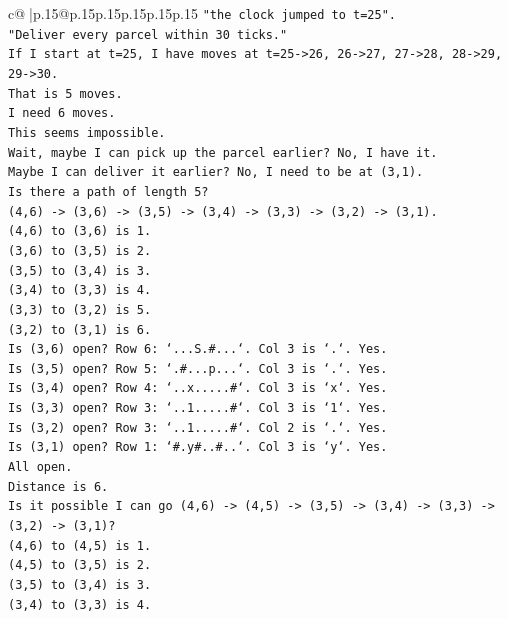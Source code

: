 \documentclass{article}
\begin{document}
{\begin{supertabular}{c@{$\;$}|p{.15\linewidth}@{}p{.15\linewidth}p{.15\linewidth}p{.15\linewidth}p{.15\linewidth}p{.15\linewidth}}
{{{\texttt{"the clock jumped to t=25".} \\
\texttt{"Deliver every parcel within 30 ticks."} \\
\texttt{If I start at t=25, I have moves at t=25{-}>26, 26{-}>27, 27{-}>28, 28{-}>29, 29{-}>30.} \\
\texttt{That is 5 moves.} \\
\texttt{I need 6 moves.} \\
\texttt{This seems impossible.} \\
\texttt{Wait, maybe I can pick up the parcel earlier? No, I have it.} \\
\texttt{Maybe I can deliver it earlier? No, I need to be at (3,1).} \\
\texttt{Is there a path of length 5?} \\
\texttt{(4,6) {-}> (3,6) {-}> (3,5) {-}> (3,4) {-}> (3,3) {-}> (3,2) {-}> (3,1).} \\
\texttt{(4,6) to (3,6) is 1.} \\
\texttt{(3,6) to (3,5) is 2.} \\
\texttt{(3,5) to (3,4) is 3.} \\
\texttt{(3,4) to (3,3) is 4.} \\
\texttt{(3,3) to (3,2) is 5.} \\
\texttt{(3,2) to (3,1) is 6.} \\
\texttt{Is (3,6) open? Row 6: `...S.\#...`. Col 3 is `.`. Yes.} \\
\texttt{Is (3,5) open? Row 5: `.\#...p...`. Col 3 is `.`. Yes.} \\
\texttt{Is (3,4) open? Row 4: `..x.....\#`. Col 3 is `x`. Yes.} \\
\texttt{Is (3,3) open? Row 3: `..1.....\#`. Col 3 is `1`. Yes.} \\
\texttt{Is (3,2) open? Row 3: `..1.....\#`. Col 2 is `.`. Yes.} \\
\texttt{Is (3,1) open? Row 1: `\#.y\#..\#..`. Col 3 is `y`. Yes.} \\
\texttt{All open.} \\
\texttt{Distance is 6.} \\
\texttt{Is it possible I can go (4,6) {-}> (4,5) {-}> (3,5) {-}> (3,4) {-}> (3,3) {-}> (3,2) {-}> (3,1)?} \\
\texttt{(4,6) to (4,5) is 1.} \\
\texttt{(4,5) to (3,5) is 2.} \\
\texttt{(3,5) to (3,4) is 3.} \\
\texttt{(3,4) to (3,3) is 4.} \\
}}}
\end{supertabular}}
\end{document}
